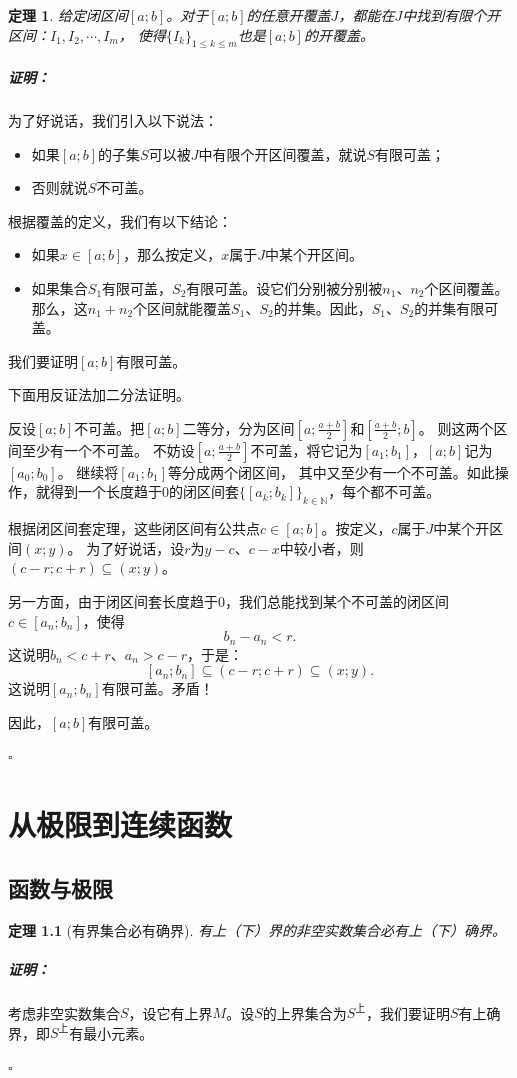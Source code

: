 \documentclass[12pt,UTF8]{ctexbook}
\newtheorem{tm}{定理}[section]
\renewenvironment{proof}{\paragraph{\textbf{证明：}}}{\hfill$\square$}
\begin{document}
\begin{appendix}
\begin{tm}
    给定闭区间$[a; b]$。对于$[a; b]$的任意开覆盖$J$，都能在$J$中找到有限个开区间：$I_1, I_2, \cdots, I_m$，
    使得$\{I_k\}_{1\leqslant k\leqslant m}$也是$[a; b]$的开覆盖。
\end{tm}
\begin{proof}
    为了好说话，我们引入以下说法：
    \begin{itemize}
        \item 如果$[a; b]$的子集$S$可以被$J$中有限个开区间覆盖，就说$S$有限可盖；
        \item 否则就说$S$不可盖。
    \end{itemize}
    根据覆盖的定义，我们有以下结论：
    \begin{itemize}
        \item 如果$x\in[a; b]$，那么按定义，$x$属于$J$中某个开区间。
        \item 如果集合$S_1$有限可盖，$S_2$有限可盖。设它们分别被分别被$n_1$、$n_2$个区间覆盖。
        那么，这$n_1 + n_2$个区间就能覆盖$S_1$、$S_2$的并集。因此，$S_1$、$S_2$的并集有限可盖。
    \end{itemize}
    
    我们要证明$[a; b]$有限可盖。

    下面用反证法加二分法证明。

    反设$[a; b]$不可盖。把$[a; b]$二等分，分为区间$[a; \frac{a+b}{2}]$和$[\frac{a+b}{2}; b]$。
    则这两个区间至少有一个不可盖。
    不妨设$[a; \frac{a+b}{2}]$不可盖，将它记为$[a_1; b_1]$，$[a; b]$记为$[a_0; b_0]$。
    继续将$[a_1; b_1]$等分成两个闭区间，
    其中又至少有一个不可盖。如此操作，就得到一个长度趋于$0$的闭区间套$\{[a_k; b_k]\}_{k\in\mathbb{N}}$，每个都不可盖。

    根据闭区间套定理，这些闭区间有公共点$c\in[a; b]$。按定义，$c$属于$J$中某个开区间$(x; y)$。
    为了好说话，设$r$为$y-c$、$c-x$中较小者，则$(c-r; c+r)\subseteq (x; y)$。

    另一方面，由于闭区间套长度趋于$0$，我们总能找到某个不可盖的闭区间$c\in [a_n; b_n]$，使得
    $$ b_n - a_n < r.$$
    这说明$b_n < c+r$、$a_n>c-r$，于是：
    $$[a_n; b_n] \subseteq (c-r; c+r) \subseteq (x; y). $$
    这说明$[a_n; b_n]$有限可盖。矛盾！

    因此，$[a; b]$有限可盖。

\end{proof}

\chapter{从极限到连续函数}
\section{函数与极限}
\begin{tm}[有界集合必有确界]\label{tm:b-0-0}
    有上（下）界的非空实数集合必有上（下）确界。
\end{tm}
\begin{proof}
    考虑非空实数集合$S$，设它有上界$M$。设$S$的上界集合为$S^{\text{上}}$，我们要证明$S$有上确界，即$S^{\text{上}}$有最小元素。


\end{proof}
\end{appendix}
\end{document}

